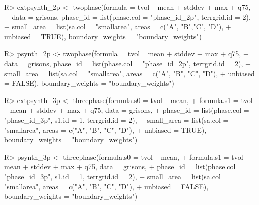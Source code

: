 \begin{small}
\begin{Schunk}
\begin{Sinput}
R> extpsynth_2p <- twophase(formula = tvol ~ mean + stddev + max + q75, 
+    data = grisons, phase_id = list(phase.col = "phase_id_2p", terrgrid.id = 2),
+    small_area = list(sa.col = "smallarea", areas = c("A", "B","C", "D"),
+    unbiased = TRUE), boundary_weights = "boundary_weights")
\end{Sinput}
\end{Schunk}
\end{small}

\begin{small}
\begin{Schunk}
\begin{Sinput}
R> psynth_2p <- twophase(formula = tvol ~ mean + stddev + max + q75, 
+    data = grisons, phase_id = list(phase.col = "phase_id_2p", terrgrid.id = 2),
+    small_area = list(sa.col = "smallarea", areas = c("A", "B", "C", "D"),
+    unbiased = FALSE), boundary_weights = "boundary_weights")
\end{Sinput}
\end{Schunk}
\end{small}
          
\begin{small}
\begin{Schunk}
\begin{Sinput}
R> extpsynth_3p <- threephase(formula.s0 = tvol ~ mean,
+    formula.s1 = tvol ~ mean + stddev + max + q75, data = grisons,
+    phase_id = list(phase.col = "phase_id_3p", s1.id = 1, terrgrid.id = 2),
+    small_area = list(sa.col = "smallarea", areas = c("A", "B", "C", "D"),
+    unbiased = TRUE), boundary_weights = "boundary_weights")
\end{Sinput}
\end{Schunk}
\end{small}

\begin{small}
\begin{Schunk}
\begin{Sinput}
R> psynth_3p <- threephase(formula.s0 = tvol ~ mean,
+   formula.s1 = tvol ~ mean + stddev + max + q75, data = grisons,
+   phase_id = list(phase.col = "phase_id_3p", s1.id = 1, terrgrid.id = 2),
+   small_area = list(sa.col = "smallarea", areas = c("A", "B", "C", "D"),
+   unbiased = FALSE), boundary_weights = "boundary_weights")
\end{Sinput}
\end{Schunk}
\end{small}

